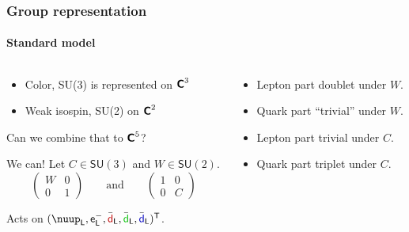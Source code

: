 \documentclass[english, fleqn]{beamer}
\newcommand\qqandqq{\qquad\text{and}\qquad}
\begin{document}
\begin{frame}
    \frametitle{Group representation}
    \framesubtitle{Standard model}

    \begin{columns}[t]
        \begin{column}{.55\textwidth}

            \begin{itemize}
                \item Color, SU(3) is represented on $\text{\bfseries\sffamily{C}}^3$
                \item Weak isospin, SU(2) on $\text{\bfseries\sffamily{C}}^2$
            \end{itemize}

            Can we combine that to $\text{\bfseries\sffamily{C}}^5$?

            \pause

            We can! Let $C \in \mathsf{SU}(3)$ and $W \in \mathsf{SU}(2)$.
            \pause
            \[
                \begin{pmatrix}
                    W & 0 \\
                    0 & 1
                \end{pmatrix}
                \qqandqq
                \begin{pmatrix}
                    1 & 0 \\
                    0 & C
                \end{pmatrix}
            \]

            Acts on $(\nuup_\mathsf L, \mathsf e^-_\mathsf L,
            \bar{\textcolor{qred}{\mathsf d}}_\mathsf L,
            \bar{\textcolor{qgreen}{\mathsf d}}_\mathsf L,
            \bar{\textcolor{qblue}{\mathsf d}}_\mathsf L)^\mathsf T$.
        \end{column}
        \pause
        \begin{column}{.45\textwidth}
            \begin{itemize}
                \item Lepton part doublet under $W$.
                \item Quark part \enquote{trivial} under $W$.
                \item Lepton part trivial under $C$.
                \item Quark part triplet under $C$.
            \end{itemize}
        \end{column}
    \end{columns}
\end{frame}
\end{document}
